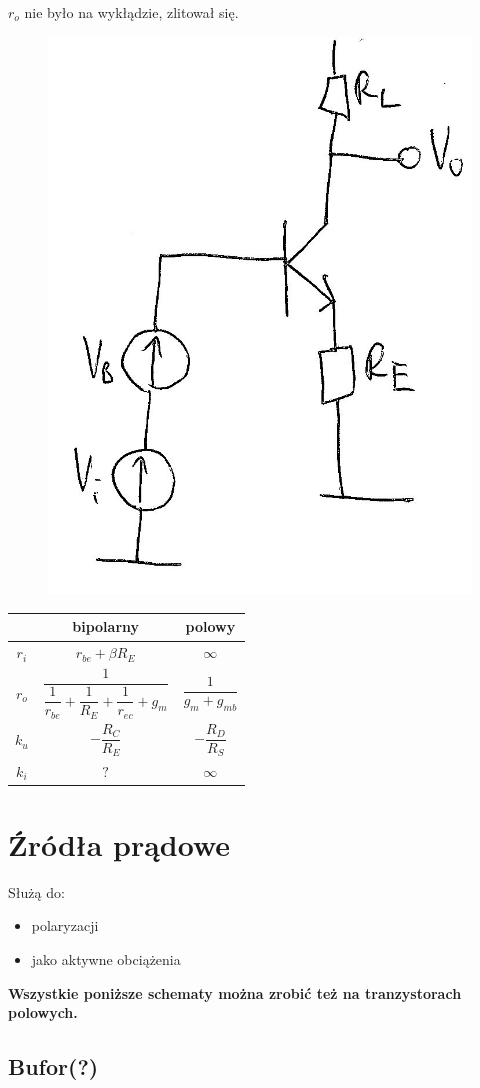\documentclass[10pt,a4paper]{article}
\begin{document}
$r_o$ nie było na wykłądzie, zlitował się.


\begin{figure}[H]
\centering
\includegraphics[height=0.5\textwidth]{WDE}
\end{figure}
\begin{tabular}{c|c|c}
& bipolarny & polowy\\
\hline
$r_i$ & $r_{be} + \beta R_E$ & $\infty$ \\ 

$r_o$ & $\dfrac{1}{\dfrac{1}{r_{be}}+\dfrac{1}{R_E}+\dfrac{1}{r_{ec}}+g_m}$ & $\dfrac{1}{g_m + g_{mb}}$ \\ 

$k_u$ & $-\dfrac{R_C}{R_E}$ & $-\dfrac{R_D}{R_S}$ \\ 

$k_i$ & $?$ & $\infty$ \\ 

\end{tabular} 

\section{Źródła prądowe}
Służą do:
\begin{itemize}
\item{polaryzacji}
\item{jako aktywne obciążenia}
\end{itemize}
\textbf{Wszystkie poniższe schematy można zrobić też na tranzystorach polowych.}

\subsection{Bufor(?)}
\end{document}
